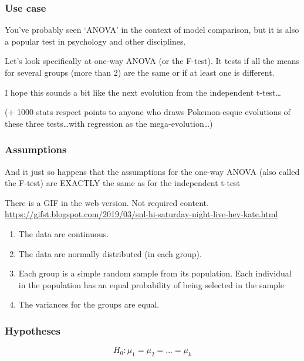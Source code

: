 \documentclass[
  openany]{book}
\providecommand{\tightlist}{%
  \setlength{\itemsep}{0pt}\setlength{\parskip}{0pt}}
\begin{document}
\hypertarget{use-case-2}{%
\subsubsection{Use case}\label{use-case-2}}

You've probably seen `ANOVA' in the context of model comparison, but it is also a popular test in psychology and other disciplines.

Let's look specifically at one-way ANOVA (or the F-test). It tests if all the means for several groups (more than 2) are the same or if at least one is different.

I hope this sounds a bit like the next evolution from the independent t-test\ldots{}

(+ 1000 stats respect points to anyone who draws Pokemon-esque evolutions of these three tests\ldots with regression as the mega-evolution\ldots)

\hypertarget{assumptions-2}{%
\subsubsection{Assumptions}\label{assumptions-2}}

And it just so happens that the assumptions for the one-way ANOVA (also called the F-test) are EXACTLY the same as for the independent t-test

There is a GIF in the web version. Not required content. \url{https://gifst.blogspot.com/2019/03/snl-hi-saturday-night-live-hey-kate.html}

\begin{enumerate}
\def\labelenumi{\arabic{enumi}.}
\tightlist
\item
  The data are continuous.
\item
  The data are normally distributed (in each group).
\item
  Each group is a simple random sample from its population. Each individual in the population has an equal probability of being selected in the sample
\item
  The variances for the groups are equal.
\end{enumerate}

\hypertarget{hypotheses-2}{%
\subsubsection{Hypotheses}\label{hypotheses-2}}

\[H_0: \mu_1 = \mu_2 = ... = \mu_k \]
\end{document}
